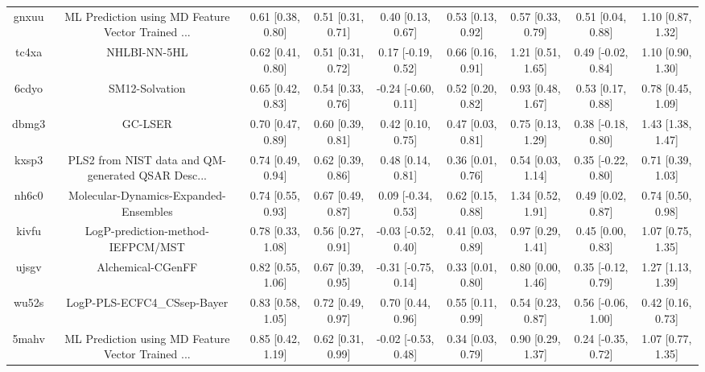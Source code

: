 \documentclass{article}
\begin{document}
\begin{center}
\begin{longtable}{|ccccccccc|}
 gnxuu &  ML Prediction using MD Feature Vector Trained ... &  0.61 [0.38, 0.80] &  0.51 [0.31, 0.71] &     0.40 [0.13, 0.67] &  0.53 [0.13, 0.92] &    0.57 [0.33, 0.79] &    0.51 [0.04, 0.88] &     1.10 [0.87, 1.32] \\
 tc4xa &                                       NHLBI-NN-5HL &  0.62 [0.41, 0.80] &  0.51 [0.31, 0.72] &    0.17 [-0.19, 0.52] &  0.66 [0.16, 0.91] &    1.21 [0.51, 1.65] &   0.49 [-0.02, 0.84] &     1.10 [0.90, 1.30] \\
 6cdyo &                                     SM12-Solvation &  0.65 [0.42, 0.83] &  0.54 [0.33, 0.76] &   -0.24 [-0.60, 0.11] &  0.52 [0.20, 0.82] &    0.93 [0.48, 1.67] &    0.53 [0.17, 0.88] &     0.78 [0.45, 1.09] \\
 dbmg3 &                                            GC-LSER &  0.70 [0.47, 0.89] &  0.60 [0.39, 0.81] &     0.42 [0.10, 0.75] &  0.47 [0.03, 0.81] &    0.75 [0.13, 1.29] &   0.38 [-0.18, 0.80] &     1.43 [1.38, 1.47] \\
 kxsp3 &  PLS2 from NIST data and QM-generated QSAR Desc... &  0.74 [0.49, 0.94] &  0.62 [0.39, 0.86] &     0.48 [0.14, 0.81] &  0.36 [0.01, 0.76] &    0.54 [0.03, 1.14] &   0.35 [-0.22, 0.80] &     0.71 [0.39, 1.03] \\
 nh6c0 &              Molecular-Dynamics-Expanded-Ensembles &  0.74 [0.55, 0.93] &  0.67 [0.49, 0.87] &    0.09 [-0.34, 0.53] &  0.62 [0.15, 0.88] &    1.34 [0.52, 1.91] &    0.49 [0.02, 0.87] &     0.74 [0.50, 0.98] \\
 kivfu &                  LogP-prediction-method-IEFPCM/MST &  0.78 [0.33, 1.08] &  0.56 [0.27, 0.91] &   -0.03 [-0.52, 0.40] &  0.41 [0.03, 0.89] &    0.97 [0.29, 1.41] &    0.45 [0.00, 0.83] &     1.07 [0.75, 1.35] \\
 ujsgv &                                  Alchemical-CGenFF &  0.82 [0.55, 1.06] &  0.67 [0.39, 0.95] &   -0.31 [-0.75, 0.14] &  0.33 [0.01, 0.80] &    0.80 [0.00, 1.46] &   0.35 [-0.12, 0.79] &     1.27 [1.13, 1.39] \\
 wu52s &                        LogP-PLS-ECFC4\_CSsep-Bayer &  0.83 [0.58, 1.05] &  0.72 [0.49, 0.97] &     0.70 [0.44, 0.96] &  0.55 [0.11, 0.99] &    0.54 [0.23, 0.87] &   0.56 [-0.06, 1.00] &     0.42 [0.16, 0.73] \\
 5mahv &  ML Prediction using MD Feature Vector Trained ... &  0.85 [0.42, 1.19] &  0.62 [0.31, 0.99] &   -0.02 [-0.53, 0.48] &  0.34 [0.03, 0.79] &    0.90 [0.29, 1.37] &   0.24 [-0.35, 0.72] &     1.07 [0.77, 1.35] \\

\end{longtable}
\end{center}
\end{document}
